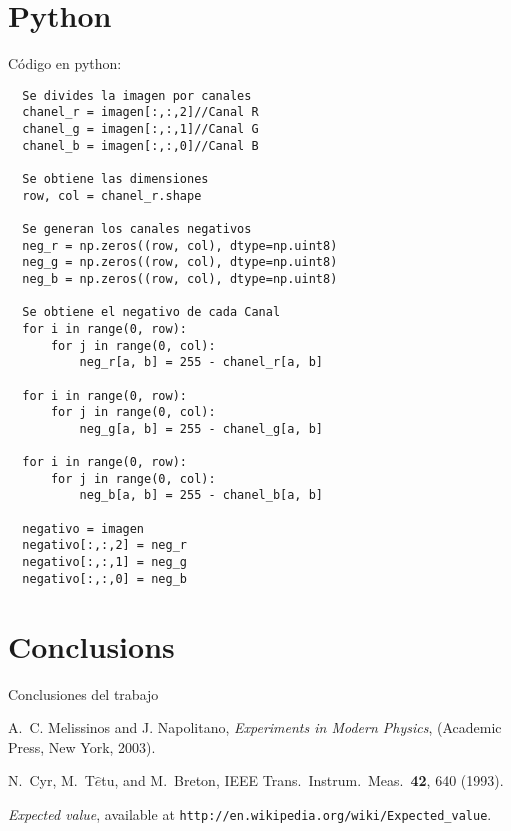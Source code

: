\documentclass[letterpaper,12pt]{article}
\begin{document}
\section{Python}
Código en python:
\begin{verbatim}
  Se divides la imagen por canales
  chanel_r = imagen[:,:,2]//Canal R
  chanel_g = imagen[:,:,1]//Canal G
  chanel_b = imagen[:,:,0]//Canal B

  Se obtiene las dimensiones
  row, col = chanel_r.shape

  Se generan los canales negativos
  neg_r = np.zeros((row, col), dtype=np.uint8)
  neg_g = np.zeros((row, col), dtype=np.uint8)
  neg_b = np.zeros((row, col), dtype=np.uint8)

  Se obtiene el negativo de cada Canal
  for i in range(0, row):                                            
      for j in range(0, col):                                          
          neg_r[a, b] = 255 - chanel_r[a, b]

  for i in range(0, row):                                            
      for j in range(0, col):                                          
          neg_g[a, b] = 255 - chanel_g[a, b]

  for i in range(0, row):                                            
      for j in range(0, col):                                          
          neg_b[a, b] = 255 - chanel_b[a, b]

  negativo = imagen
  negativo[:,:,2] = neg_r
  negativo[:,:,1] = neg_g
  negativo[:,:,0] = neg_b
\end{verbatim}

\section{Conclusions}
Conclusiones del trabajo


\begin{thebibliography}{99}

A.~C. Melissinos and J. Napolitano, \textit{Experiments in Modern Physics},
(Academic Press, New York, 2003).

N.\ Cyr, M.\ T$\hat{e}$tu, and M.\ Breton,
IEEE Trans.\ Instrum.\ Meas.\ \textbf{42}, 640 (1993).

 \emph{Expected value},  available at
\texttt{http://en.wikipedia.org/wiki/Expected\_value}.

\end{thebibliography}
\end{document}
